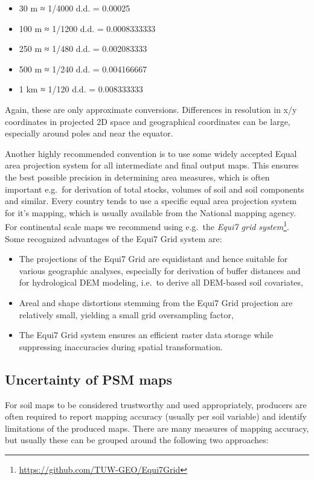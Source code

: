 \documentclass[graybox,natbib,nospthms,UStrade]{svmono}
\renewcommand{\href}[2]{#2 (\url{#1})}
\renewcommand{\href}[2]{#2\footnote{\url{#1}}}
\begin{document}
\begin{itemize}
\item
  30 m ≈ 1/4000 d.d. = 0.00025
\item
  100 m ≈ 1/1200 d.d. = 0.0008333333
\item
  250 m ≈ 1/480 d.d. = 0.002083333
\item
  500 m ≈ 1/240 d.d. = 0.004166667
\item
  1 km ≈ 1/120 d.d. = 0.008333333
\end{itemize}

Again, these are only approximate conversions. Differences in resolution
in x/y coordinates in projected 2D space and geographical coordinates
can be large, especially around poles and near the equator.

Another highly recommended convention is to use some widely accepted
Equal area projection system for all intermediate and final output maps. This ensures the best
possible precision in determining area measures, which is often
important e.g.~for derivation of total stocks, volumes of soil and soil
components and similar. Every country tends to use a specific equal area
projection system for it's mapping, which is usually available from the
National mapping agency. For continental scale maps we recommend using
e.g.~the \href{https://github.com/TUW-GEO/Equi7Grid}{\emph{Equi7 grid system}}.
Some recognized advantages of the Equi7 Grid system are:

\begin{itemize}
\item
  The projections of the Equi7 Grid are equidistant and hence suitable
  for various geographic analyses, especially for derivation of
  buffer distances and for hydrological DEM modeling, i.e.~to derive
  all DEM-based soil covariates,
\item
  Areal and shape distortions stemming from the Equi7 Grid projection
  are relatively small, yielding a small grid oversampling factor,
\item
  The Equi7 Grid system ensures an efficient raster data storage while
  suppressing inaccuracies during spatial transformation.
\end{itemize}

\hypertarget{uncertainty-of-psm-maps}{%
\subsection{Uncertainty of PSM maps}\label{uncertainty-of-psm-maps}}

For soil maps to be considered trustworthy and used appropriately,
producers are often required to report mapping accuracy (usually per
soil variable) and identify limitations of the produced maps.
There are many measures of mapping accuracy, but usually these can be
grouped around the following two approaches:
\end{document}
